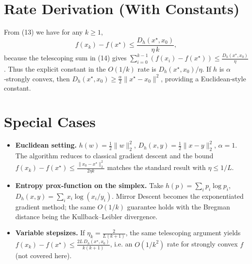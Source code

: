 \documentclass{article}
\newcommand{\DD}[2]{D_{h}(#1,#2)}
\begin{document}
\section*{Rate Derivation (With Constants)}
From (13) we have for any $k\ge1$,
\[
f(x_k)-f(x^{\star})\le\frac{\DD{x^{\star}}{x_0}}{\eta\,k},
\]
because the telescoping sum in (14) gives
\(\sum_{i=0}^{k-1}(f(x_i)-f(x^{\star}))\le\frac{\DD{x^{\star}}{x_0}}{\eta}\).
Thus the explicit constant in the $O(1/k)$ rate is $\DD{x^{\star}}{x_0}/\eta$.
If $h$ is $\alpha$‑strongly convex, then
\(\DD{x^{\star}}{x_0}\ge \frac{\alpha}{2}\|x^{\star}-x_0\|^{2}\), providing a
Euclidean‑style constant.

\section*{Special Cases}
\begin{itemize}
\item \textbf{Euclidean setting.} $h(w)=\tfrac12\|w\|_2^{2}$,
$\DD{x}{y}= \tfrac12\|x-y\|_2^{2}$, $\alpha=1$.
The algorithm reduces to classical gradient descent and the bound
\(f(x_k)-f(x^{\star})\le\frac{\|x_0-x^{\star}\|_2^{2}}{2\eta k}\) matches the
standard result with $\eta\le1/L$.
\item \textbf{Entropy prox‑function on the simplex.}
Take $h(p)=\sum_{i}p_i\log p_i$, $\DD{x}{y}=\sum_i x_i\log(x_i/y_i)$.
Mirror Descent becomes the exponentiated gradient method; the same
$O(1/k)$ guarantee holds with the Bregman distance being the Kullback–Leibler
divergence.
\item \textbf{Variable stepsizes.}
If $\eta_k=\frac{2}{L(k+1)}$, the same telescoping argument yields
\(f(x_k)-f(x^{\star})\le\frac{2L\,\DD{x^{\star}}{x_0}}{k(k+1)}\),
i.e. an $O(1/k^{2})$ rate for strongly convex $f$ (not covered here).
\end{itemize}
\end{document}
